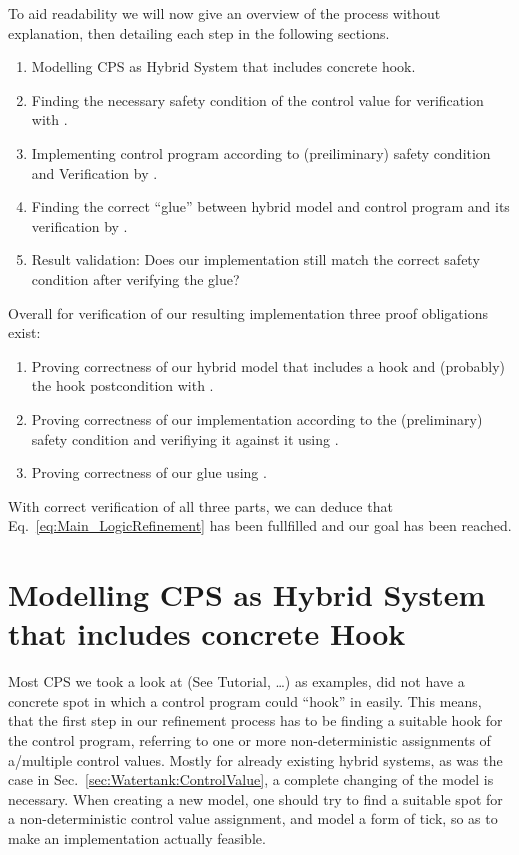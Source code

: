 To aid readability we will now give an overview of the process without explanation, then detailing each step in the following sections. 

\begin{enumerate}
	\item Modelling CPS as Hybrid System that includes concrete hook.
	\item Finding the necessary safety condition of the control value for verification with \keym.
	\item Implementing control program according to (preiliminary) safety condition and Verification by \key.		
	\item Finding the correct ``glue'' between hybrid model and control program and its verification by \keym.
	\item Result validation: Does our implementation still match the correct safety condition after verifying the glue?
\end{enumerate}

Overall for verification of our resulting implementation three proof obligations exist:
\begin{enumerate}[label=\roman*]
	\item Proving correctness of our hybrid model that includes a hook and (probably) the hook postcondition with \keym.
	\item Proving correctness of our implementation according to the (preliminary) safety condition and verifiying it against it using \key.
	\item Proving correctness of our glue using \keym.
\end{enumerate} 

With correct verification of all three parts, we can deduce that Eq.~\ref{eq:Main_LogicRefinement} has been fullfilled and our goal has been reached.

\section{Modelling CPS as Hybrid System that includes concrete Hook}
\label{sec:Process:Hook}
Most CPS we took a look at (See \cite{keymaera} Tutorial, \cite[p.~5, p.~11]{platzer2010b} \dots) as examples, did not have a concrete spot in which a control program could ``hook'' in easily. This means, that the first step in our refinement process has to be finding a suitable hook for the control program, referring to one or more non-deterministic assignments of a/multiple control values. Mostly for already existing hybrid systems, as was the case in Sec.~\ref{sec:Watertank:ControlValue}, a complete changing of the model is necessary. When creating a new model, one should try to find a suitable spot for a non-deterministic control value assignment, and model a form of tick, so as to make an implementation actually feasible.

